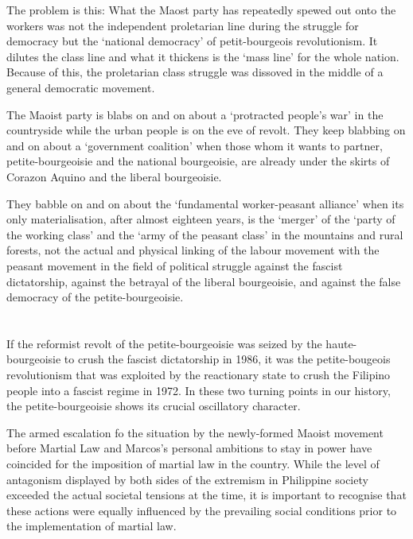 The problem is this:
What the Maost party 
has repeatedly spewed out onto the workers
was not the independent proletarian line 
during the struggle for democracy
but the `national democracy'
of petit-bourgeois revolutionism.
It dilutes the class line 
and what it thickens is the `mass line'
for the whole nation. 
Because of this, 
the proletarian class struggle was dissoved
in the middle of a general democratic movement.

The Maoist party is blabs on and on 
about a `protracted people's war' in the countryside 
while the urban people is on the eve of revolt. 
They keep blabbing on and on about a `government coalition'
when those whom it wants to partner, 
petite-bourgeoisie and the national bourgeoisie,
are already under the skirts of Corazon Aquino and the liberal bourgeoisie.


They babble on and on about the `fundamental worker-peasant alliance'
when its only materialisation,
after almost eighteen years, 
is the `merger' of the `party of the working class' 
and the `army of the peasant class' in the mountains and rural forests,
not the actual and physical linking 
of the labour movement with the peasant movement 
in the field of political struggle against the fascist dictatorship, 
against the betrayal of the liberal bourgeoisie, 
and against the false democracy of the petite-bourgeoisie.


\section{}
If the reformist revolt of the petite-bourgeoisie 
was seized by the haute-bourgeoisie
to crush the fascist dictatorship in 1986,
it was the petite-bougeois revolutionism 
that was exploited
by the reactionary state 
to crush the Filipino people 
into a fascist regime in 1972.
In these two turning points in our history,
the petite-bourgeoisie shows its crucial oscillatory character.

The armed escalation fo the situation 
by the newly-formed Maoist movement 
before Martial Law and Marcos's personal ambitions 
to stay in power 
have coincided for the imposition of martial law in the country.
While the level of antagonism displayed by both sides of the extremism 
in Philippine society 
exceeded the actual societal tensions at the time, 
it is important to recognise 
that these actions were equally influenced 
by the prevailing social conditions 
prior to the implementation of martial law.



